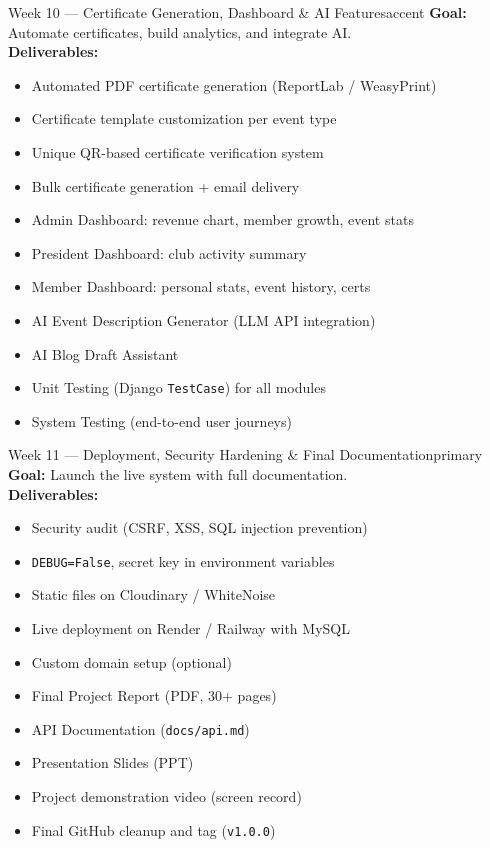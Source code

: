 \documentclass[12pt,a4paper]{article}
\begin{document}
\begin{weekbox}{Week 10 --- Certificate Generation, Dashboard \& AI Features}{accent}
\textbf{Goal:} Automate certificates, build analytics, and integrate AI.\\[6pt]
\textbf{Deliverables:}
\begin{itemize}[leftmargin=*, itemsep=2pt]
  \item Automated PDF certificate generation (ReportLab / WeasyPrint)
  \item Certificate template customization per event type
  \item Unique QR-based certificate verification system
  \item Bulk certificate generation + email delivery
  \item Admin Dashboard: revenue chart, member growth, event stats
  \item President Dashboard: club activity summary
  \item Member Dashboard: personal stats, event history, certs
  \item AI Event Description Generator (LLM API integration)
  \item AI Blog Draft Assistant
  \item Unit Testing (Django \texttt{TestCase}) for all modules
  \item System Testing (end-to-end user journeys)
\end{itemize}
\end{weekbox}

\vspace{8pt}

\begin{weekbox}{Week 11 --- Deployment, Security Hardening \& Final Documentation}{primary}
\textbf{Goal:} Launch the live system with full documentation.\\[6pt]
\textbf{Deliverables:}
\begin{itemize}[leftmargin=*, itemsep=2pt]
  \item Security audit (CSRF, XSS, SQL injection prevention)
  \item \texttt{DEBUG=False}, secret key in environment variables
  \item Static files on Cloudinary / WhiteNoise
  \item Live deployment on Render / Railway with MySQL
  \item Custom domain setup (optional)
  \item Final Project Report (PDF, 30+ pages)
  \item API Documentation (\texttt{docs/api.md})
  \item Presentation Slides (PPT)
  \item Project demonstration video (screen record)
  \item Final GitHub cleanup and tag (\texttt{v1.0.0})
\end{itemize}
\end{weekbox}
\end{document}
